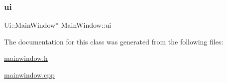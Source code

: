 \mbox{\label{class_main_window_a35466a70ed47252a0191168126a352a5}} 
\subsubsection{\texorpdfstring{ui}{ui}}
{\footnotesize\ttfamily Ui\+::\+Main\+Window$\ast$ Main\+Window\+::ui\hspace{0.3cm}{\ttfamily [private]}}



The documentation for this class was generated from the following files\+:\begin{DoxyCompactItemize}
\item 
\mbox{\hyperlink{mainwindow_8h}{mainwindow.\+h}}\item 
\mbox{\hyperlink{mainwindow_8cpp}{mainwindow.\+cpp}}\end{DoxyCompactItemize}
